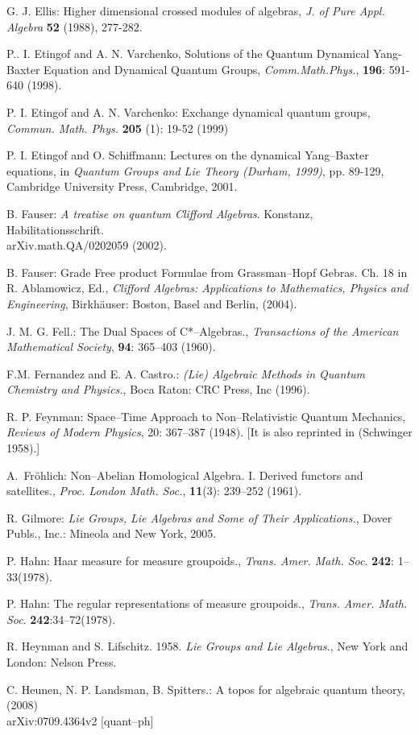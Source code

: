 \documentclass[12pt]{article}
\theoremstyle{plain}
\theoremstyle{definition}
\numberwithin{equation}{section}
\newcommand{\<}{{\langle}}
\begin{document}
\begin{thebibliography}{9}
G. J. Ellis: Higher dimensional crossed modules of algebras,
\emph{J. of Pure Appl. Algebra} \textbf{52} (1988), 277-282.

P.. I. Etingof and A. N. Varchenko, Solutions of the Quantum Dynamical Yang-Baxter Equation and Dynamical Quantum Groups, \emph{Comm.Math.Phys.}, \textbf{196}: 591-640 (1998).

P. I. Etingof and A. N. Varchenko: Exchange dynamical quantum
groups, \emph{Commun. Math. Phys.} \textbf{205} (1): 19-52 (1999)

P. I. Etingof and O. Schiffmann: Lectures on the dynamical Yang--Baxter equations, in \emph{Quantum Groups and Lie Theory (Durham, 1999)}, pp. 89-129, Cambridge University Press, Cambridge, 2001.

B. Fauser: \emph{A treatise on quantum Clifford Algebras}. Konstanz,
Habilitationsschrift. \\ arXiv.math.QA/0202059 (2002).

B. Fauser: Grade Free product Formulae from Grassman--Hopf Gebras.
Ch. 18 in R. Ablamowicz, Ed., \emph{Clifford Algebras: Applications to Mathematics, Physics and Engineering}, Birkh\"{a}user: Boston, Basel and Berlin, (2004).

J. M. G. Fell.: The Dual Spaces of  C*--Algebras., \emph{Transactions of the American
Mathematical Society}, \textbf{94}: 365--403 (1960).

F.M. Fernandez and E. A. Castro.:  \emph{(Lie) Algebraic Methods in Quantum Chemistry and Physics.}, Boca Raton: CRC Press, Inc  (1996).

 R. P. Feynman: Space--Time Approach to Non--Relativistic Quantum Mechanics, {\em Reviews 
of Modern Physics}, 20: 367--387 (1948). [It is also reprinted in (Schwinger 1958).]

A.~Fr{\"o}hlich: Non--Abelian Homological Algebra. {I}.
{D}erived functors and satellites.\/, \emph{Proc. London Math. Soc.}, \textbf{11}(3): 239--252 (1961).

R. Gilmore: \emph{Lie Groups, Lie Algebras and Some of Their Applications.},
Dover Publs., Inc.: Mineola and New York, 2005.

P. Hahn: Haar measure for measure groupoids., \textit{Trans. Amer. Math. Soc}. \textbf{242}: 1--33(1978).

P. Hahn: The regular representations of measure groupoids., \textit{Trans. Amer. Math. Soc}. \textbf{242}:34--72(1978).

R. Heynman and S. Lifschitz. 1958. \emph{Lie Groups and Lie Algebras}., New York and London: Nelson Press.

C. Heunen, N. P. Landsman, B. Spitters.: A topos for algebraic quantum theory, (2008)   \\ 
arXiv:0709.4364v2 [quant--ph]

\end{thebibliography}

\end{document}

